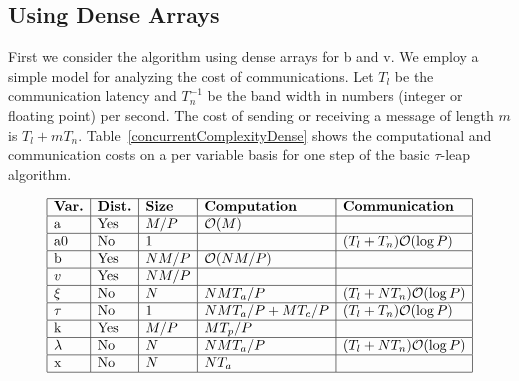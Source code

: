 \documentclass[letterpaper]{article}
\begin{document}
\subsection{Using Dense Arrays}



First we consider the algorithm using dense arrays for b and v.
We employ a simple model for analyzing the cost of communications.
Let $T_l$ be the communication latency and $T_n^{-1}$ be the band
width in numbers (integer or floating point) per second.  The cost of
sending or receiving a message of length $m$ is $T_l + m T_n$.  
Table~\ref{concurrentComplexityDense} shows the computational and 
communication costs on a per
variable basis for one step of the basic $\tau$-leap algorithm.

\begin{table}[h]
\[
\begin{array}{|l|l|l|l|l|}
\hline %
\text{\bf{Var.}} & 
\text{\bf{Dist.}} & 
\text{\bf{Size}} & 
\text{\bf{Computation}} & 
\text{\bf{Communication}} \\
\hline %
\text{a} &
\text{Yes} &
M / P &
\mathcal{O}(M) &
\\
\hline %
\text{a0} & 
\text{No} &
1 &
&
(T_l + T_n) \mathcal{O}(\log P) \\
\hline %
\text{b} &
\text{Yes} &
N M / P &
\mathcal{O}(N M / P) &
\\
\hline %
v &
\text{Yes} &
N M / P &
&
\\
\hline %
\xi &
\text{No} &
N &
N M T_a / P &
(T_l + N T_n) \mathcal{O}(\log P) \\
\hline %
\tau & 
\text{No} &
1 &
N M T_a / P + M T_c / P &
(T_l + T_n) \mathcal{O}(\log P) \\
\hline %
\text{k} & 
\text{Yes} &
M / P &
M T_p / P&
\\
\hline %
\lambda & 
\text{No} &
N &
N M T_a / P &
(T_l + N T_n) \mathcal{O}(\log P) \\
\hline %
\text{x} & 
\text{No} &
N &
N T_a&
\\
\hline %
\end{array}
\]
\caption{Computational and communication complexity for one step in the 
	concurrent algorithm for
	the basic $\tau$-leap method using dense arrays.}
\label{concurrentComplexityDense}
\end{table}
\end{document}
